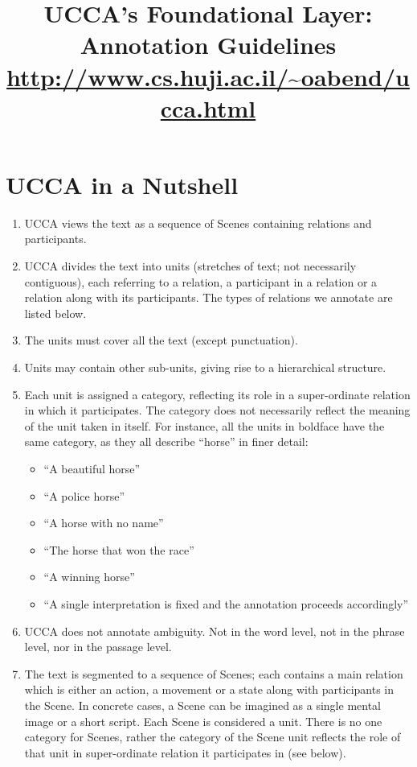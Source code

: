 \documentclass[11pt]{article}
\title{UCCA's Foundational Layer:  Annotation 	Guidelines \\
\url{http://www.cs.huji.ac.il/~oabend/ucca.html}}
\begin{document}
\maketitle
\tableofcontents

\newpage
\section{\large UCCA in a Nutshell}

\begin{enumerate}

\item
UCCA views the text as a sequence of Scenes containing relations and participants.
\item
  UCCA divides the text into units (stretches of text; not necessarily contiguous), each referring to a relation,
  a participant in a relation or a relation along with its participants. The types of relations we annotate
  are listed below.
\item
The units must cover all the text (except punctuation).
\item
Units may contain other sub-units, giving rise to a hierarchical structure.
\item
Each unit is assigned a category, reflecting its role in a super-ordinate relation in which it participates. The category does not necessarily reflect the meaning of the unit taken in itself. For instance, all the units in boldface have the same category, as they all describe ``horse'' in finer detail:

\begin{itemize}
\item
``A beautiful horse''
\item
``A police horse''
\item
``A horse with no name''
\item
``The horse that won the race''
\item
``A winning horse''
\item
``A single interpretation is fixed and the annotation proceeds accordingly''
\end{itemize}

\item
UCCA does not annotate ambiguity. Not in the word level, not in the phrase level, nor in the passage level.

\item
The text is segmented to a sequence of Scenes; each contains a main relation which is either an action, a movement or a state along with participants in the Scene. In concrete cases, a Scene can be imagined as a single mental image or a short script. Each Scene is considered a unit. There is no one category for Scenes, rather the category of the Scene unit reflects the role of that unit in super-ordinate relation it participates in (see below).


\end{enumerate}
\end{document}
